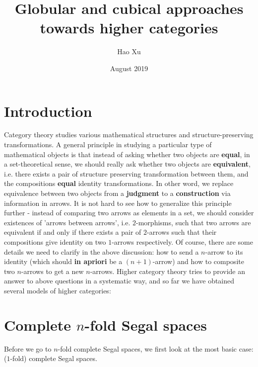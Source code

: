 \documentclass{article}
\title{Globular and cubical approaches towards higher categories}
\author{Hao Xu}
\date{August 2019}
\theoremstyle{definition}
\theoremstyle{remark}
\begin{document}
\maketitle

\section{Introduction}

Category theory studies various mathematical structures and structure-preserving transformations. A general principle in studying a particular type of mathematical objects is that instead of asking whether two objects are \textbf{equal}, in a set-theoretical sense, we should really ask whether two objects are \textbf{equivalent}, i.e. there exists a pair of structure preserving transformation between them, and the compositions \textbf{equal} identity transformations. In other word, we replace equivalence between two objects from a \textbf{judgment} to a \textbf{construction} via information in arrows. It is not hard to see how to generalize this principle further - instead of comparing two arrows as elements in a set, we should consider existences of ’arrows between arrows’, i.e. $2$-morphisms, such that two arrows are equivalent if and only if there exists a pair of $2$-arrows such that their compositions give identity on two $1$-arrows respectively. Of course, there are some details we need to clarify in the above discussion: how to send a $n$-arrow to its identity (which should \textbf{in apriori} be a $(n+1)$-arrow) and how to composite two $n$-arrows to get a new $n$-arrows. Higher category theory tries to provide an answer to above questions in a systematic way, and so far we have obtained several models of higher categories:

\section{Complete $n$-fold Segal spaces}

Before we go to $n$-fold complete Segal spaces, we first look at the most basic case: ($1$-fold) complete Segal spaces.
\end{document}
